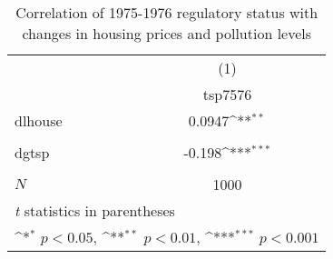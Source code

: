 \begin{table}[htbp]\centering
\def\sym#1{\ifmmode^{#1}\else\(^{#1}\)\fi}
\caption{Correlation of 1975-1976 regulatory status with changes in housing prices and pollution levels\label{IIb2}}
\begin{tabular}{l*{1}{c}}
\hline\hline
            &\multicolumn{1}{c}{(1)}\\
            &\multicolumn{1}{c}{tsp7576}\\
\hline
dlhouse     &      0.0947\sym{**} \\
            &                     \\
[1em]
dgtsp       &      -0.198\sym{***}\\
            &                     \\
\hline
\(N\)       &        1000         \\
\hline\hline
\multicolumn{2}{l}{\footnotesize \textit{t} statistics in parentheses}\\
\multicolumn{2}{l}{\footnotesize \sym{*} \(p<0.05\), \sym{**} \(p<0.01\), \sym{***} \(p<0.001\)}\\
\end{tabular}
\end{table}
